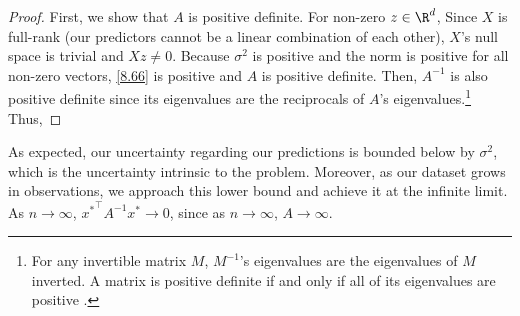 \begin{proof}
First, we show that $A$ is positive definite. For non-zero $z \in \R^d$, 
Since $X$ is full-rank (our predictors cannot be a linear combination of each other), $X$'s null space is trivial and $Xz \neq 0$. Because $\sigma^2$ is positive and the norm is positive for all non-zero vectors, \eqref{8.66} is positive and $A$ is positive definite. Then, $A^{-1}$ is also positive definite since its eigenvalues are the reciprocals of $A$'s eigenvalues.\footnote{For any invertible matrix $M$, $M^{-1}$'s eigenvalues are the eigenvalues of $M$ inverted. A matrix is positive definite if and only if all of its eigenvalues are positive \cite{axler_linear_2014}.} Thus, 
\end{proof}
As expected, our uncertainty regarding our predictions is bounded below by $\sigma^2$, which is the uncertainty intrinsic to the problem. Moreover, as our dataset grows in observations, we approach this lower bound and achieve it at the infinite limit. As $n \rightarrow \infty$, ${x^*}^\top A^{-1}x^* \rightarrow 0$, since as $n \rightarrow \infty$, $A \rightarrow \infty$.  